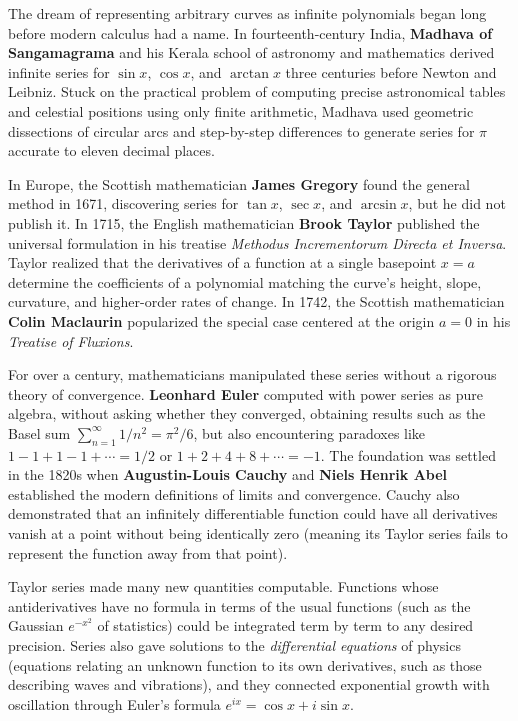 \begin{historybox}
The dream of representing arbitrary curves as infinite polynomials began long before modern calculus had a name. In fourteenth-century India, \textbf{Madhava of Sangamagrama} and his Kerala school of astronomy and mathematics derived infinite series for $\sin x$, $\cos x$, and $\arctan x$ three centuries before Newton and Leibniz. Stuck on the practical problem of computing precise astronomical tables and celestial positions using only finite arithmetic, Madhava used geometric dissections of circular arcs and step-by-step differences to generate series for $\pi$ accurate to eleven decimal places.

In Europe, the Scottish mathematician \textbf{James Gregory} found the general method in 1671, discovering series for $\tan x$, $\sec x$, and $\arcsin x$, but he did not publish it. In 1715, the English mathematician \textbf{Brook Taylor} published the universal formulation in his treatise \emph{Methodus Incrementorum Directa et Inversa}. Taylor realized that the derivatives of a function at a single basepoint $x = a$ determine the coefficients of a polynomial matching the curve's height, slope, curvature, and higher-order rates of change. In 1742, the Scottish mathematician \textbf{Colin Maclaurin} popularized the special case centered at the origin $a = 0$ in his \emph{Treatise of Fluxions}.

For over a century, mathematicians manipulated these series without a rigorous theory of convergence. \textbf{Leonhard Euler} computed with power series as pure algebra, without asking whether they converged, obtaining results such as the Basel sum $\sum_{n=1}^\infty 1/n^2 = \pi^2/6$, but also encountering paradoxes like $1 - 1 + 1 - 1 + \cdots = 1/2$ or $1 + 2 + 4 + 8 + \cdots = -1$. The foundation was settled in the 1820s when \textbf{Augustin-Louis Cauchy} and \textbf{Niels Henrik Abel} established the modern definitions of limits and convergence. Cauchy also demonstrated that an infinitely differentiable function could have all derivatives vanish at a point without being identically zero (meaning its Taylor series fails to represent the function away from that point).

Taylor series made many new quantities computable. Functions whose antiderivatives have no formula in terms of the usual functions (such as the Gaussian $e^{-x^2}$ of statistics) could be integrated term by term to any desired precision. Series also gave solutions to the \emph{differential equations} of physics (equations relating an unknown function to its own derivatives, such as those describing waves and vibrations), and they connected exponential growth with oscillation through Euler's formula $e^{ix} = \cos x + i\sin x$.


\end{historybox}
